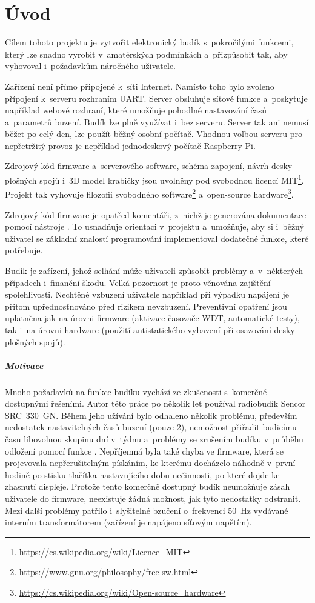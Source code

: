 \chapter{Úvod}
Cílem tohoto projektu je vytvořit elektronický budík s~pokročilými funkcemi,
který lze snadno vyrobit v~amatérských podmínkách a~přizpůsobit tak, aby
vyhovoval i~požadavkům náročného uživatele.

Zařízení není přímo připojené k~síti Internet. Namísto toho bylo zvoleno
přípojení k~serveru rozhraním UART. Server obsluhuje síťové funkce a~poskytuje
například webové rozhraní, které umožňuje pohodlné nastavování časů a~parametrů
buzení. Budík lze plně využívat i~bez serveru. Server tak ani nemusí běžet po
celý den, lze použít běžný osobní počítač. Vhodnou volbou serveru pro
nepřetržitý provoz je nepříklad jednodeskový počítač Raspberry Pi.

Zdrojový kód firmware a~serverového software, schéma zapojení, návrh desky
plošných spojů i~3D model krabičky jsou uvolněny pod svobodnou
licencí MIT\footnote{\url{https://cs.wikipedia.org/wiki/Licence_MIT}}.
Projekt tak vyhovuje filozofii svobodného
software\footnote{\url{https://www.gnu.org/philosophy/free-sw.html}}
a~open-source
hardware\footnote{\url{https://cs.wikipedia.org/wiki/Open-source_hardware}}.

Zdrojový kód firmware je opatřed komentáři, z~nichž je generována dokumentace
pomocí nástroje . To usnadňuje orientaci v~projektu
a~umožňuje, aby si i~běžný uživatel se základní znalostí programování
implementoval dodatečné funkce, které potřebuje.

Budík je zařízení, jehož selhání může uživateli způsobit problémy a~v~některých
případech i~finanční škodu. Velká pozornost je proto věnována zajištění
spolehlivosti. Nechtěné vzbuzení uživatele například při výpadku napájení je
přitom upřednosťnováno před rizikem nevzbuzení. Preventivní opatření jsou
uplatněna jak na úrovni firmware (aktivace časovače \acs{WDT}, automatické
testy), tak i~na úrovni hardware (použití antistatického vybavení při osazování
desky plošných spojů).

\paragraph{Motivace}
Mnoho požadavků na funkce budíku vychází ze zkušenosti s~komerčně dostupnými
řešeními. Autor této práce po několik let používal radiobudík Sencor
SRC~330~GN. Během jeho užívání bylo odhaleno několik problému, především
nedostatek nastavitelných časů buzení (pouze 2), nemožnost přiřadit budicímu
času libovolnou skupinu dní v~týdnu a~problémy se zrušením budíku v~průběhu
odložení pomocí funkce . Nepříjemná byla také chyba ve firmware,
která se projevovala nepřerušitelným pískáním, ke kterému docházelo náhodně
v~první hodině po stisku tlačítka nastavujícího dobu nečinnosti, po které dojde
ke zhasnutí displeje. Protože tento komerčně dostupný budík neumožňuje zásah
uživatele do firmware, neexistuje žádná možnost, jak tyto nedostatky odstranit.
Mezi další problémy patřilo i~slyšitelné bzučení o~frekvenci \SI{50}{\hertz}
vydávané interním transformátorem (zařízení je napájeno síťovým napětím).

